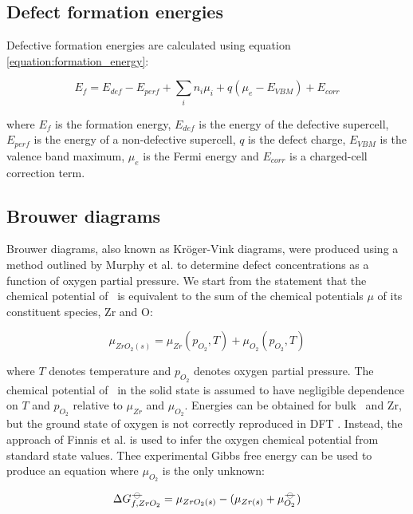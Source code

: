 \subsection{Defect formation energies}

Defective formation energies are calculated using equation \ref{equation:formation_energy}:

\begin{equation} \label{equation:formation_energy}
    E_{f} = E_{def} - E_{perf} + \sum_{i} n_i\mu_i + q(\mu_{e} - E_{VBM}) + E_{corr}
\end{equation}

where $E_{f}$ is the formation energy, $E_{def}$ is the energy of the defective supercell, $E_{perf}$ is the energy of a non-defective supercell, $q$ is the defect charge, $E_{VBM}$ is the valence band maximum, $\mu_{e}$ is the Fermi energy and $E_{corr}$ is a charged-cell correction term.

\subsection{Brouwer diagrams}

Brouwer diagrams, also known as Kr{\"o}ger-Vink diagrams, were produced using a method outlined by Murphy et al. \cite{Murphy2014} to determine defect concentrations as a function of oxygen partial pressure. We start from the statement that the chemical potential of \zirconia\ is equivalent to the sum of the chemical potentials $\mu$ of its constituent species, Zr and O:

\begin{equation}
{\mu}_{ZrO_2(s)} = {\mu}_{Zr}(p_{O_2}, T) + {\mu}_{O_2}(p_{O_2}, T)
\label{mewZrO2results1}
\end{equation}

where $T$ denotes temperature and $p_{O_2}$ denotes oxygen partial pressure. The chemical potential of \zirconia\ in the solid state is assumed to have negligible dependence on $T$ and $p_{O_2}$ relative to ${\mu}_{Zr}$ and ${\mu}_{O_2}$. Energies can be obtained for bulk \zirconia\ and Zr, but the ground state of oxygen is not correctly reproduced in DFT \cite{Batyrev2000,Lozovoi2001}. Instead, the approach of Finnis et al. \cite{Finnis2005} is used to infer the oxygen chemical potential from standard state values. Thee experimental Gibbs free energy can be used to produce an equation where $\mu_{O_2}$ is the only unknown:

\begin{equation}
\Delta{G^{{\ensuremath{-\kern-4pt{\ominus}\kern-4pt-}}}_{f, ZrO_2}} = \mu_{ZrO_2(s)} - (\mu_{Zr(s)} + \mu^{{-\kern-4pt{\ominus}\kern-4pt-}}_{O_2})
\end{equation}

